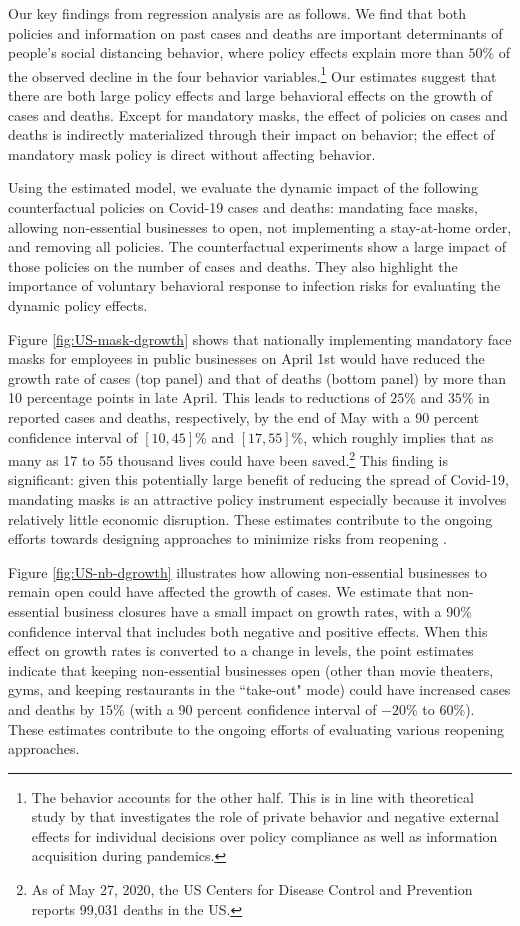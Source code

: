 \documentclass[11pt,reqno,letter]{amsart}
\theoremstyle{definition}
\begin{document}
Our key findings from regression analysis are as follows.  We find
that both policies and information on past cases and deaths are important
determinants of people's social distancing behavior, where policy
effects explain more than $50\%$ of the observed decline in the four
behavior variables.\footnote{The behavior accounts for the other half. This is in line with theoretical study by \cite{gitmez2020} that investigates the role of private behavior and
negative external effects for individual decisions over policy compliance as well as information acquisition during pandemics.} Our estimates suggest that there are both large policy effects and large behavioral effects on the growth of cases and deaths. Except for mandatory masks, the effect of policies on cases and deaths is indirectly materialized through their impact on behavior; the effect of mandatory mask policy is direct without affecting behavior.


Using the estimated model, we evaluate the dynamic impact of the following counterfactual policies on Covid-19 cases and deaths: mandating face masks, allowing non-essential businesses to open, not implementing a stay-at-home order, and removing all policies.  The counterfactual experiments show a large impact of  those policies on  the number of cases and deaths.  They also highlight the importance of voluntary behavioral response to infection risks for evaluating the dynamic policy effects.

Figure \ref{fig:US-mask-dgrowth} shows that nationally  implementing mandatory
face masks  for employees in public businesses on April 1st would have reduced the growth rate of cases (top panel)
and that of deaths (bottom panel) by more than 10 percentage points in late April. This leads to reductions of $25$\% and $35$\% in reported cases and deaths, respectively,  by the end of May with a 90 percent confidence interval of $[10,45]$\% and $[17,55]$\%, which  roughly implies that as many as 17 to 55
  thousand lives could have been saved.\footnote{As of May 27, 2020,
   the US Centers for Disease Control and Prevention  reports 99,031
   deaths in the US.}
This finding is significant: given this potentially large  benefit of reducing the spread of Covid-19, mandating masks is an attractive policy instrument especially because it involves relatively little economic disruption. These estimates contribute to the ongoing efforts towards designing approaches to minimize risks from reopening \citep{stock2020b}.


Figure \ref{fig:US-nb-dgrowth} illustrates how allowing non-essential businesses to remain open could
have affected the growth of cases.  We estimate that
non-essential business closures have a small impact on growth rates,
with a 90\% confidence interval that includes both negative and
positive effects. When this effect on growth rates is converted to a
change in levels, the point estimates indicate that keeping
non-essential businesses open (other than movie theaters, gyms, and
keeping restaurants in the ``take-out" mode) could have increased
cases and  deaths by  $15\%$ (with a 90 percent confidence interval of
$-20\%$ to $60\%$).  These estimates contribute to the ongoing efforts of evaluating various reopening approaches.
\end{document}

